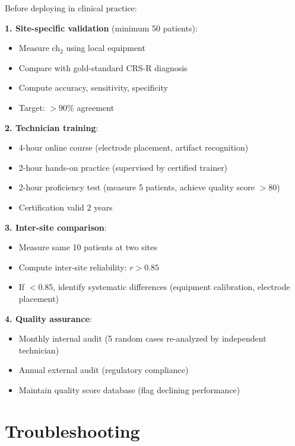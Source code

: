 \begin{protocol}\label{prot:clinical-validation}
Before deploying in clinical practice:

\textbf{1. Site-specific validation} (minimum 50 patients):
\begin{itemize}
\item Measure ch$_2$ using local equipment
\item Compare with gold-standard CRS-R diagnosis
\item Compute accuracy, sensitivity, specificity
\item Target: $> 90\%$ agreement
\end{itemize}

\textbf{2. Technician training}:
\begin{itemize}
\item 4-hour online course (electrode placement, artifact recognition)
\item 2-hour hands-on practice (supervised by certified trainer)
\item 2-hour proficiency test (measure 5 patients, achieve quality score $> 80$)
\item Certification valid 2 years
\end{itemize}

\textbf{3. Inter-site comparison}:
\begin{itemize}
\item Measure same 10 patients at two sites
\item Compute inter-site reliability: $r > 0.85$
\item If $< 0.85$, identify systematic differences (equipment calibration, electrode placement)
\end{itemize}

\textbf{4. Quality assurance}:
\begin{itemize}
\item Monthly internal audit (5 random cases re-analyzed by independent technician)
\item Annual external audit (regulatory compliance)
\item Maintain quality score database (flag declining performance)
\end{itemize}
\end{protocol}

\section{Troubleshooting}

